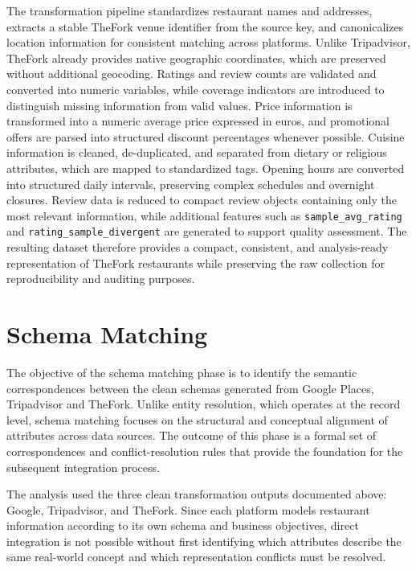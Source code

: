 The transformation pipeline standardizes restaurant names and addresses, extracts a stable TheFork venue identifier from the source key, and canonicalizes location information for consistent matching across platforms. Unlike Tripadvisor, TheFork already provides native geographic coordinates, which are preserved without additional geocoding. Ratings and review counts are validated and converted into numeric variables, while coverage indicators are introduced to distinguish missing information from valid values. Price information is transformed into a numeric average price expressed in euros, and promotional offers are parsed into structured discount percentages whenever possible. Cuisine information is cleaned, de-duplicated, and separated from dietary or religious attributes, which are mapped to standardized tags. Opening hours are converted into structured daily intervals, preserving complex schedules and overnight closures. Review data is reduced to compact review objects containing only the most relevant information, while additional features such as \texttt{sample\_avg\_rating} and \texttt{rating\_sample\_divergent} are generated to support quality assessment. The resulting dataset therefore provides a compact, consistent, and analysis-ready representation of TheFork restaurants while preserving the raw collection for reproducibility and auditing purposes.



\section{Schema Matching}

The objective of the schema matching phase is to identify the semantic correspondences between the clean schemas generated from Google Places, Tripadvisor and TheFork. Unlike entity resolution, which operates at the record level, schema matching focuses on the structural and conceptual alignment of attributes across data sources. The outcome of this phase is a formal set of correspondences and conflict-resolution rules that provide the foundation for the subsequent integration process.

The analysis used the three clean transformation outputs documented above:
Google, Tripadvisor, and TheFork.
Since each platform models restaurant information according to its own schema
and business objectives, direct integration is not possible without first
identifying which attributes describe the same real-world concept and which
representation conflicts must be resolved.

